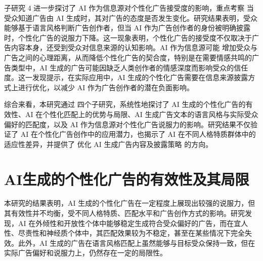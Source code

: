 子研究 4 进一步探讨了 AI 作为信息源对个性化广告接受度的影响，重点考察 当受众知道广告由 AI 生成时，其对广告的态度是否发生变化。研究结果表明，受众能够基于语言风格判断广告创作者，但当 AI 作为广告创作者的身份被明确披露 时，个性化广告的说服力下降。这一现象表明，个性化广告的接受度不仅取决于广告内容本身，还受到受众对信息来源的认知影响。AI 作为信息源可能 增加受众与广告之间的心理距离，从而降低个性化广告的契合度，特别是在需要情感共鸣的广告类型中，AI 生成的广告可能因缺乏人类创作者的情感深度而影响受众的信任度。这一发现提示，在实际应用中，AI 生成的个性化广告需要在信息来源披露方式上进行优化，以减少 AI 作为广告创作者的潜在负面影响。

综合来看，本研究通过 四个子研究，系统性地探讨了 AI 生成的个性化广告的有效性、AI 在个性化匹配上的优势与局限、AI 生成广告文本的语言风格与实际受众偏好的匹配度，以及 AI 作为信息源对个性化广告说服力的影响。研究结果不仅验证了 AI 在个性化广告创作中的应用潜力，也揭示了 AI 在不同人格特质群体中的适应性差异，并提供了 优化 AI 生成广告内容及披露策略 的方向。

\section{AI生成的个性化广告的有效性及其局限}

本研究的结果表明，AI 生成的个性化广告在一定程度上展现出较强的说服力，但其有效性并不均衡，受不同人格特质、匹配水平和广告创作方式的影响。研究发现，AI 在外倾性和开放性个体中能够稳定生成符合受众偏好的广告，而在宜人性、尽责性和神经质个体中，其匹配效果较为不稳定，甚至在某些情况下完全失效。此外，AI 生成的广告在语言风格匹配上虽然能够与目标受众保持一致，但在实际广告偏好和说服力上，仍然存在一定的局限性。

